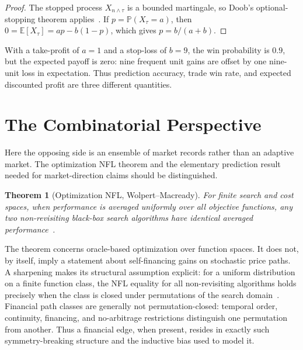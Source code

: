 \documentclass[aps,pra,reprint,superscriptaddress,amsmath,amssymb,floatfix]{revtex4-2}
\theoremstyle{plain}
\newtheorem{theorem}{Theorem}
\theoremstyle{definition}
\theoremstyle{remark}
\begin{document}
\begin{proof}
The stopped process \(X_{n\wedge\tau}\) is a bounded martingale, so Doob's
optional-stopping theorem applies~\cite{Doob1953}. If
\(p=\mathbb{P}(X_\tau=a)\), then
\(0=\mathbb{E}[X_\tau]=ap-b(1-p)\), which gives
\(p=b/(a+b)\).
\end{proof}

With a take-profit of \(a=1\) and a stop-loss of \(b=9\), the win probability
is \(0.9\), but the expected payoff is zero: nine frequent unit gains are
offset by one nine-unit loss in expectation. Thus prediction accuracy, trade
win rate, and expected discounted profit are three different quantities.

\section{The Combinatorial Perspective}
\label{sec:nfl}

Here the opposing side is an ensemble of market records rather than an
adaptive market. The optimization NFL theorem and the elementary prediction
result needed for market-direction claims should be distinguished.

\begin{theorem}[Optimization NFL, Wolpert--Macready]
  \label{thm:nfl}
  For finite search and cost spaces, when performance is averaged uniformly
  over all objective functions, any two non-revisiting black-box search
  algorithms have identical averaged
  performance~\cite{Wolpert:1997:NFL:2221336.2221408}.
\end{theorem}

The theorem concerns oracle-based optimization over function spaces. It does
not, by itself, imply a statement about self-financing gains on stochastic
price paths. A sharpening makes its structural assumption explicit: for a
uniform distribution on a finite function class, the NFL equality for all
non-revisiting algorithms holds precisely when the class is closed under
permutations of the search domain~\cite{SchumacherVoseWhitley2001}. Financial
path classes are generally not permutation-closed: temporal order, continuity,
financing, and no-arbitrage restrictions distinguish one permutation from
another. Thus a financial edge, when present, resides in exactly such
symmetry-breaking structure and the inductive bias used to model it.
\end{document}
